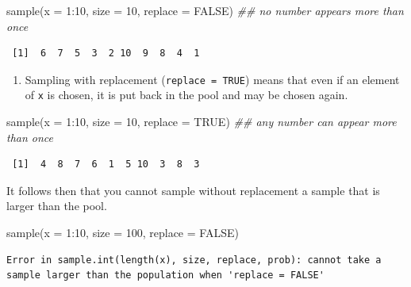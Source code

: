 \documentclass[
  letterpaper,
]{book}
\newenvironment{Shaded}{\begin{snugshade}}{\end{snugshade}}
\newcommand{\AttributeTok}[1]{\textcolor[rgb]{0.40,0.45,0.13}{#1}}
\newcommand{\ConstantTok}[1]{\textcolor[rgb]{0.56,0.35,0.01}{#1}}
\newcommand{\DecValTok}[1]{\textcolor[rgb]{0.68,0.00,0.00}{#1}}
\newcommand{\DocumentationTok}[1]{\textcolor[rgb]{0.37,0.37,0.37}{\textit{#1}}}
\newcommand{\FunctionTok}[1]{\textcolor[rgb]{0.28,0.35,0.67}{#1}}
\newcommand{\NormalTok}[1]{\textcolor[rgb]{0.00,0.23,0.31}{#1}}
\newcommand{\SpecialCharTok}[1]{\textcolor[rgb]{0.37,0.37,0.37}{#1}}
\providecommand{\tightlist}{%
  \setlength{\itemsep}{0pt}\setlength{\parskip}{0pt}}\usepackage{longtable,booktabs,array}
\theoremstyle{definition}
\theoremstyle{definition}
\theoremstyle{plain}
\theoremstyle{definition}
\theoremstyle{plain}
\theoremstyle{plain}
\theoremstyle{remark}
\begin{document}
\begin{Shaded}
\begin{Highlighting}[]
\FunctionTok{sample}\NormalTok{(}\AttributeTok{x =} \DecValTok{1}\SpecialCharTok{:}\DecValTok{10}\NormalTok{, }\AttributeTok{size =} \DecValTok{10}\NormalTok{, }\AttributeTok{replace =} \ConstantTok{FALSE}\NormalTok{) }\DocumentationTok{\#\# no number appears more than once}
\end{Highlighting}
\end{Shaded}

\begin{verbatim}
 [1]  6  7  5  3  2 10  9  8  4  1
\end{verbatim}

\begin{enumerate}
\def\labelenumi{\arabic{enumi}.}
\setcounter{enumi}{1}
\tightlist
\item
  Sampling with replacement (\texttt{replace\ =\ TRUE}) means that even
  if an element of \texttt{x} is chosen, it is put back in the pool and
  may be chosen again.
\end{enumerate}

\begin{Shaded}
\begin{Highlighting}[]
\FunctionTok{sample}\NormalTok{(}\AttributeTok{x =} \DecValTok{1}\SpecialCharTok{:}\DecValTok{10}\NormalTok{, }\AttributeTok{size =} \DecValTok{10}\NormalTok{, }\AttributeTok{replace =} \ConstantTok{TRUE}\NormalTok{) }\DocumentationTok{\#\# any number can appear more than once}
\end{Highlighting}
\end{Shaded}

\begin{verbatim}
 [1]  4  8  7  6  1  5 10  3  8  3
\end{verbatim}

It follows then that you cannot sample without replacement a sample that
is larger than the pool.

\begin{Shaded}
\begin{Highlighting}[]
\FunctionTok{sample}\NormalTok{(}\AttributeTok{x =} \DecValTok{1}\SpecialCharTok{:}\DecValTok{10}\NormalTok{, }\AttributeTok{size =} \DecValTok{100}\NormalTok{, }\AttributeTok{replace =} \ConstantTok{FALSE}\NormalTok{)}
\end{Highlighting}
\end{Shaded}

\begin{verbatim}
Error in sample.int(length(x), size, replace, prob): cannot take a sample larger than the population when 'replace = FALSE'
\end{verbatim}
\end{document}
